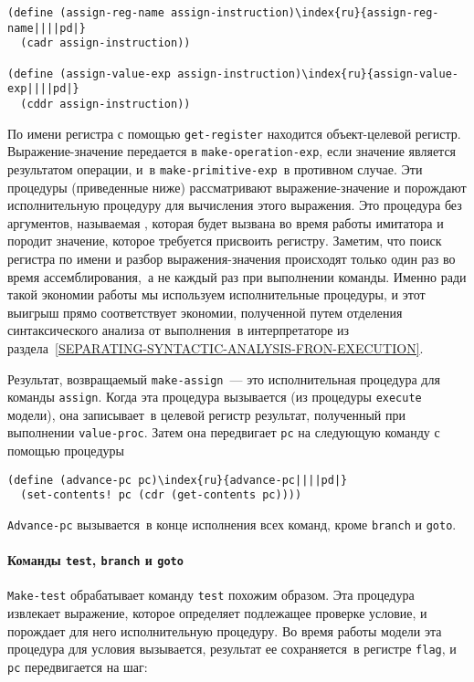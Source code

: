 \begin{Verbatim}[fontsize=\small]
(define (assign-reg-name assign-instruction)\index{ru}{assign-reg-name||||pd|}
  (cadr assign-instruction))

(define (assign-value-exp assign-instruction)\index{ru}{assign-value-exp||||pd|}
  (cddr assign-instruction))
\end{Verbatim}
По имени регистра с помощью {\tt get-register} находится
объект-целевой регистр. Выражение-значение передается в
{\tt make-operation-exp}, если значение является результатом
операции, и~в {\tt make-primitive-exp}~в противном случае. Эти
процедуры (приведенные ниже) рассматривают выражение-значение и
порождают исполнительную процедуру для вычисления этого
выражения. Это процедура без аргументов, называемая
, которая будет вызвана во время работы
имитатора и породит значение, которое требуется присвоить регистру.
Заметим, что поиск регистра по имени и разбор
выражения-значения происходят только один раз во время
ассемблирования,~а не каждый раз при выполнении команды. Именно ради
такой экономии работы мы используем исполнительные процедуры, и этот
выигрыш прямо соответствует экономии, полученной путем   отделения
синтаксического анализа от выполнения~в интерпретаторе из 
раздела~\ref{SEPARATING-SYNTACTIC-ANALYSIS-FRON-EXECUTION}.

Результат, возвращаемый {\tt make-assign}~--- это
исполнительная процедура для команды {\tt assign}.  Когда
эта процедура вызывается (из процедуры {\tt execute} модели),
она записывает~в целевой регистр результат, полученный при выполнении
{\tt value-proc}.  Затем она передвигает {\tt pc} на
следующую команду с помощью процедуры

\begin{Verbatim}[fontsize=\small]
(define (advance-pc pc)\index{ru}{advance-pc||||pd|}
  (set-contents! pc (cdr (get-contents pc))))
\end{Verbatim}
{\tt Advance-pc} вызывается~в конце исполнения всех команд,
кроме {\tt branch} и {\tt goto}.

\paragraph{Команды {\tt test}, {\tt branch} и
{\tt goto}}


{\tt Make-test} обрабатывает команду
{\tt test} похожим образом.  Эта процедура извлекает выражение,
которое определяет подлежащее проверке условие, и порождает для него
исполнительную процедуру.  Во время работы модели эта процедура для
условия вызывается, результат ее сохраняется~в регистре
{\tt flag}, и {\tt pc} передвигается на шаг:

